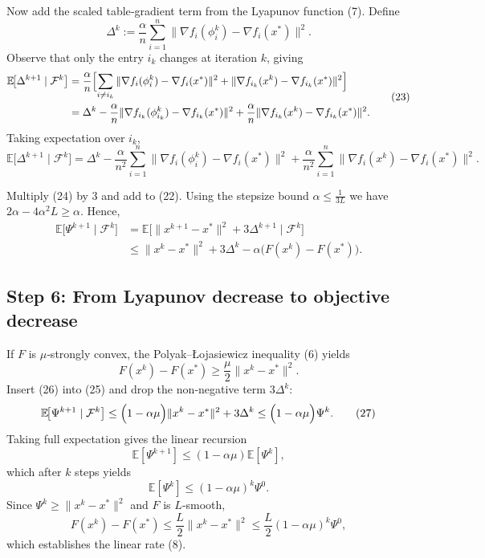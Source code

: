 \documentclass{article}
\newcommand{\E}{\mathbb{E}}
\newcommand{\grad}{\nabla}
\begin{document}
Now add the scaled table‑gradient term from the Lyapunov function (7). Define
\[
\Delta^{k}:=\frac{\alpha}{n}\sum_{i=1}^{n}\|\grad f_i(\phi_i^{k})-\grad f_i(x^{*})\|^{2}.
\]
Observe that only the entry $i_k$ changes at iteration $k$, giving
\[
\begin{aligned}
\E\!\bigl[\Delta^{k+1}\mid\mathcal{F}^{k}\bigr]
&= \frac{\alpha}{n}\Bigl[
\sum_{i\neq i_k}\|\grad f_i(\phi_i^{k})-\grad f_i(x^{*})\|^{2}
+ \|\grad f_{i_k}(x^{k})-\grad f_{i_k}(x^{*})\|^{2}
\Bigr] \\
&= \Delta^{k} -\frac{\alpha}{n}\|\grad f_{i_k}(\phi_{i_k}^{k})-\grad f_{i_k}(x^{*})\|^{2}
+\frac{\alpha}{n}\|\grad f_{i_k}(x^{k})-\grad f_{i_k}(x^{*})\|^{2}.
\end{aligned}
\tag{23}
\]
Taking expectation over $i_k$,
\[
\E\!\bigl[\Delta^{k+1}\mid\mathcal{F}^{k}\bigr]
= \Delta^{k}
- \frac{\alpha}{n^{2}}\sum_{i=1}^{n}\|\grad f_i(\phi_i^{k})-\grad f_i(x^{*})\|^{2}
+ \frac{\alpha}{n^{2}}\sum_{i=1}^{n}\|\grad f_i(x^{k})-\grad f_i(x^{*})\|^{2}.
\tag{24}
\]

Multiply (24) by $3$ and add to (22). Using the stepsize bound $\alpha\le \frac{1}{3L}$ we have $2\alpha-4\alpha^{2}L\ge \alpha$. Hence,
\[
\begin{aligned}
\E\!\bigl[\Psi^{k+1}\mid\mathcal{F}^{k}\bigr]
&= \E\!\bigl[\|x^{k+1}-x^{*}\|^{2} + 3\Delta^{k+1}\mid\mathcal{F}^{k}\bigr] \\
&\le \|x^{k}-x^{*}\|^{2}+3\Delta^{k}
-\alpha\bigl(F(x^{k})-F(x^{*})\bigr) .
\end{aligned}
\tag{25}
\]

\subsection*{Step 6: From Lyapunov decrease to objective decrease}
If $F$ is $\mu$‑strongly convex, the Polyak–Łojasiewicz inequality (6) yields
\[
F(x^{k})-F(x^{*})\ge \frac{\mu}{2}\|x^{k}-x^{*}\|^{2}.
\tag{26}
\]
Insert (26) into (25) and drop the non‑negative term $3\Delta^{k}$:
\[
\E\!\bigl[\Psi^{k+1}\mid\mathcal{F}^{k}\bigr]
\le \Bigl(1-\alpha\mu\Bigr)\|x^{k}-x^{*}\|^{2}+3\Delta^{k}
\le \Bigl(1-\alpha\mu\Bigr)\Psi^{k}.
\tag{27}
\]
Taking full expectation gives the linear recursion
\[
\E[\Psi^{k+1}]\le (1-\alpha\mu)\E[\Psi^{k}],
\]
which after $k$ steps yields
\[
\E[\Psi^{k}]\le (1-\alpha\mu)^{k}\Psi^{0}.
\tag{28}
\]
Since $\Psi^{k}\ge \|x^{k}-x^{*}\|^{2}$ and $F$ is $L$‑smooth,
\[
F(x^{k})-F(x^{*})\le \frac{L}{2}\|x^{k}-x^{*}\|^{2}
\le \frac{L}{2}(1-\alpha\mu)^{k}\Psi^{0},
\]
which establishes the linear rate (8).
\end{document}
